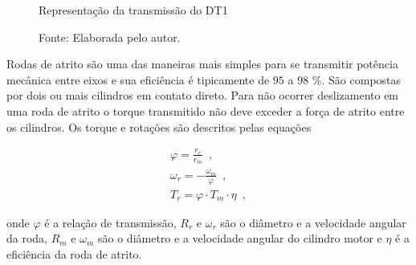 \begin{figure}[H]
	\centering
	\caption{Representação da transmissão do DT1}
	\label{dig:Trasmissao}
	\caption*{\footnotesize Fonte: Elaborada pelo autor.}
\end{figure}

Rodas de atrito são uma das maneiras mais simples para se transmitir potência mecânica entre eixos e sua eficiência é tipicamente de $95$ a $98$ {\%}. São compostas por dois ou mais cilindros em contato direto.  
Para não ocorrer deslizamento em uma roda de atrito o torque transmitido não deve exceder a força de atrito entre os cilindros. Os torque e rotações são descritos pelas equações 

\begin{subequations}
	\label{eq:Transmissao}
	\begin{align}
		\varphi = \frac{r_{r}}{r_{m}}\enspace, \label{eq:Transmissao_1} \\
		\omega_{r} = -\frac{\omega_{m}}{\varphi}\enspace, \label{eq:Transmissao_2}  \\
		T_{r} =\varphi \cdot T_{m} \cdot \eta\enspace, \label{eq:Transmissao_3}
	\end{align}
\end{subequations}

onde $\varphi$ é a relação de transmissão, $R_{r}$ e $\omega_{r}$ são o diâmetro e a velocidade angular da roda, 
$R_{m}$ e $\omega_{m}$ são o diâmetro e a velocidade angular do cilindro motor e $\eta$ é a eficiência da roda de atrito. \cite[Seç.~20.4]{book:Niemann1971}\cite[Seç.~9.1]{book:Norton2010}



